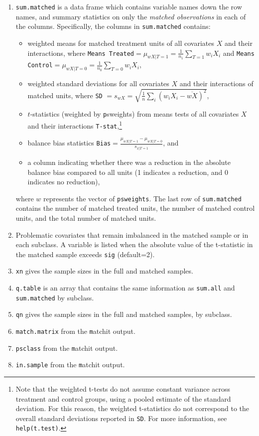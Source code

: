 \documentclass[oneside,letterpaper,titlepage]{article}
\begin{document}
\begin{enumerate}
\item \texttt{sum.matched} is a data frame which contains variable
  names down the row names, and summary statistics on only the
  \emph{matched observations} in each of the columns.  Specifically,
  the columns in \texttt{sum.matched} contains:
  \begin{itemize}
  \item weighted means for matched treatment units of all covariates
    $X$ and their interactions, where \texttt{Means Treated}$=
    \mu_{wX|T=1} = \frac{1}{n_1} \sum_{T=1} w_iX_i$ and \texttt{Means
      Control}$=\mu_{wX|T=0} = \frac{1}{n_0} \sum_{T=0} w_iX_i$,
  \item weighted standard deviations for all covariates $X$ and their
    interactions of matched units, where \texttt{SD} $= s_{wX} =
    \sqrt{\frac{1}{n} \sum_{i} (w_iX_i - \overline{wX})^2}$,
  \item $t$-statistics (weighted by {\texttt psweights}) from means
    tests of all covariates $X$ and their interactions
    \texttt{T-stat},\footnote{Note that the weighted t-tests do not
      assume constant variance across treatment and control groups,
      using a pooled estimate of the standard deviation.  For this
      reason, the weighted t-statistics do not correspond to the
      overall standard deviations reported in \texttt{SD}.  For more
      information, see \texttt{help(t.test)}.}
  \item balance bias statistics \texttt{Bias}$=\frac{\mu_{wX|T=1} -
      \mu_{wX|T=0}}{s_{x|T=1}}$, and
  \item a column indicating whether there was a reduction in the
    absolute balance bias compared to all units (1 indicates a
    reduction, and 0 indicates no reduction),
  \end{itemize}
  where $w$ represents the vector of \texttt{psweights}.  The last row
  of \texttt{sum.matched} contains the number of matched treated
  units, the number of matched control units, and the total number of
  matched units.
  
\item Problematic covariates that remain imbalanced in the matched
  sample or in each subclass.  A variable is listed when the absolute
  value of the t-statistic in the matched sample exceeds \texttt{sig}
  (default=2).
  
\item \texttt{xn} gives the sample sizes in the full and matched
  samples.
  
\item \texttt{q.table} is an array that contains the same information
  as \texttt{sum.all} and \texttt{sum.matched} by subclass.
  
\item \texttt{qn} gives the sample sizes in the full and matched
  samples, by subclass.
\item \texttt{match.matrix} from the {\texttt matchit} output.
\item \texttt{psclass} from the {\texttt matchit} output.
\item \texttt{in.sample} from the {\texttt matchit} output.
\end{enumerate}
\end{document}
